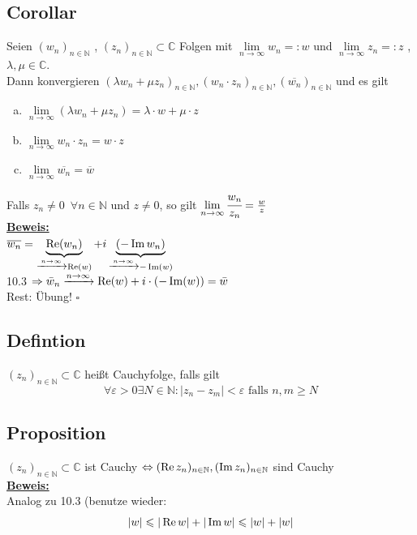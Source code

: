 \subsection{Corollar} %
\label{sub:corollar}
Seien $(w_n)_{n \in \mathds{N} }$ , $(z_n)_{n \in \mathds{N}} \subset \mathds{C}$ Folgen mit 
$\lim\limits_{n \to \infty} w_n =:w$ und $\lim\limits_{n \to \infty} z_n =: z$ , $\lambda , \mu \in \mathds{C}$.
\vspace{10pt} \\
Dann konvergieren $(\lambda w_n + \mu z_n)_{n \in \mathds{N}} , (w_n \cdot z_n)_{n \in \mathds{N}} , ( \overline{w_n})_{n \in \mathds{N}}$ und es gilt
\begin{enumerate}[(a)]
	\item $\lim\limits_{n \to \infty} (\lambda w_n + \mu z_n) = \lambda \cdot w + \mu \cdot z$
	\item $\lim\limits_{n \to \infty} w_n \cdot z_n = w \cdot z$
	\item $\lim\limits_{n \to \infty} \overline{w_n} = \overline{w}$
\end{enumerate}
Falls $z_n \not= 0 \enspace \forall n \in \mathds{N}$ und $z \not=0$, so gilt $\lim\limits_{n \to \infty} \cfrac{w_n}{z_n} = \frac{w}{z}  $
\vspace{\baselineskip} \\
\underline{\textbf{Beweis:}} \\
$ \overline{w_n} = \underbrace{\operatorname{Re} (w_n)}_{\xrightarrow{n \to \infty} \operatorname{Re} (w)} + i \underbrace{(- \operatorname{Im} w_n)}_{\xrightarrow{n \to \infty} - \operatorname{Im} (w)}$ 
\vspace{10pt} \\
10.3 $\Rightarrow \bar w_n \xrightarrow{n \to \infty} \operatorname{Re} (w) + i \cdot ( - \operatorname{Im} (w)) = \bar w$  \\
Rest: Übung! \hfill \( \square \)

\subsection{Defintion} %
\label{sub:defintion}
$(z_n)_{n \in \mathds{N}} \subset \mathds{C}$ heißt Cauchyfolge, falls gilt
\[
	\forall \varepsilon>0 \exists N \in \mathds{N} : |z_n -z_m|< \varepsilon \text{ falls } n,m \ge N
\]

\subsection{Proposition} %
\label{sub:proposition}
$(z_n)_{n \in \mathds{N} } \subset \mathds{C}$ ist Cauchy $\Leftrightarrow (\operatorname{Re} z_n)_{n \in \mathbb{N}} , ( \operatorname{Im} z_n)_{n \in \mathbb{N} }$ sind Cauchy 
\vspace{10pt} \\
\underline{\textbf{Beweis:}} \\
Analog zu 10.3 (benutze wieder:
\[
	|w| \leqslant |\operatorname{Re} w | +|\operatorname{Im} w | \leqslant |w| + |w|
\]

